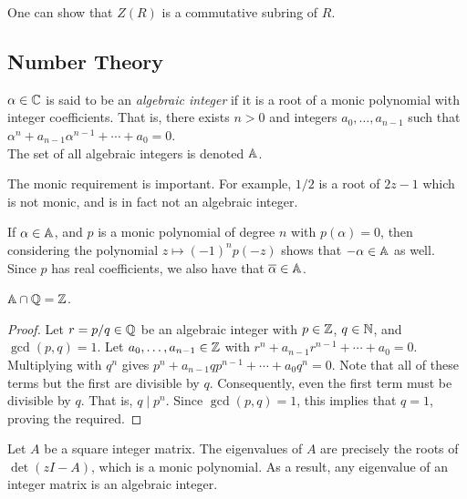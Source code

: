 		One can show that $Z(R)$ is a commutative subring of $R$.

	\subsection{Number Theory}


		\begin{fdef}
			\label{def: algebraic integer}
			$\alpha \in \mathbb{C}$ is said to be an \emph{algebraic integer} if it is a root of a monic polynomial with integer coefficients. That is, there exists $n > 0$ and integers $a_0,\ldots,a_{n-1}$ such that $\alpha^n + a_{n-1}\alpha^{n-1} + \cdots + a_0 = 0$.\\
			The set of all algebraic integers is denoted $\mathbb{A}$.
		\end{fdef}

		The monic requirement is important. For example, $1/2$ is a root of $2z-1$ which is not monic, and is in fact not an algebraic integer.

		\begin{fex}
			If $\alpha \in \mathbb{A}$, and $p$ is a monic polynomial of degree $n$ with $p(\alpha) = 0$, then considering the polynomial $z \mapsto (-1)^n p(-z)$ shows that $-\alpha \in \mathbb{A}$ as well. Since $p$ has real coefficients, we also have that $\overline{\alpha} \in \mathbb{A}$.
		\end{fex}

		\begin{fprop}
			\label{prop: rational alg ints are ints}
			$\mathbb{A} \cap \mathbb{Q} = \mathbb{Z}$.
		\end{fprop}
		\begin{proof}
			Let $r = p/q \in \mathbb{Q}$ be an algebraic integer with $p \in \mathbb{Z}$, $q \in \mathbb{N}$, and $\gcd(p,q) = 1$. Let $a_0,\ldots,a_{n-1} \in \mathbb{Z}$ with $r^n + a_{n-1}r^{n-1} + \cdots + a_0 = 0$. Multiplying with $q^n$ gives $p^n + a_{n-1}qp^{n-1} + \cdots + a_0q^n = 0$. Note that all of these terms but the first are divisible by $q$. Consequently, even the first term must be divisible by $q$. That is, $q \mid p^n$. Since $\gcd(p,q) = 1$, this implies that $q=1$, proving the required.
		\end{proof}

		\begin{fex}
			Let $A$ be a square integer matrix. The eigenvalues of $A$ are precisely the roots of $\det(zI - A)$, which is a monic polynomial. As a result, any eigenvalue of an integer matrix is an algebraic integer.
		\end{fex}

